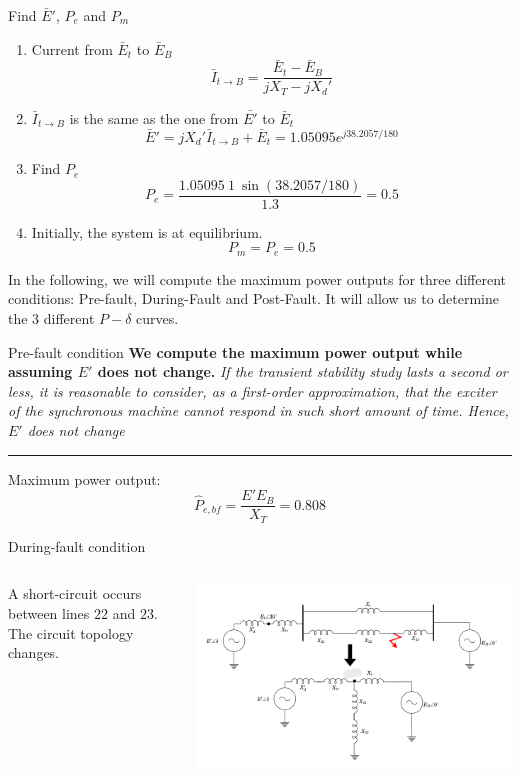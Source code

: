 \begin{frame}[allowframebreaks]{Find $\bar{E}'$, $P_e$ and $P_m$}
\begin{enumerate}
    \item Current from $\bar{E}_{t}$ to $\bar{E}_{B}$
    $$\bar{I}_{t\rightarrow B} = \frac{\bar{E}_{t}-\bar{E}_{B}}{jX_{T} - jX_{d}'}$$
    \item $\bar{I}_{t\rightarrow B}$ is the same as the one from $\bar{E'}$ to $\bar{E}_{t}$
    $$\bar{E}' = j X_{d}' \bar{I}_{t\rightarrow B} + \bar{E}_{t} = 1.05095 e^{j 38.2057/180}$$
    \item Find $P_e$
    $$P_e = \frac{1.05095\ 1\ \sin(38.2057/180)}{1.3} = 0.5$$
    \item Initially, the system is at equilibrium.
    $$P_m = P_e = 0.5$$
\end{enumerate}
In the following, we will compute the maximum power outputs for three different conditions: Pre-fault, During-Fault and Post-Fault. It will allow us to determine the 3 different $P-\delta$ curves.
\end{frame}

\begin{frame}{Pre-fault condition}
\textbf{We compute the maximum power output while assuming $E'$ does not change.}
\emph{If the transient stability study lasts a second or less, it is reasonable to consider, as a first-order approximation, that the exciter of the synchronous machine cannot respond in such short amount of time. Hence, $E'$ does not change}
\vspace{0.5cm}
\hrule
\vspace{0.5cm}
Maximum power output:
$$\hat{P}_{e,bf} = \frac{E'E_{B}}{X_{T}} = 0.808$$
\end{frame}

\begin{frame}{During-fault condition}
\begin{columns}
\begin{column}{0.25\textwidth}
A short-circuit occurs between lines $22$ and $23$. The circuit topology changes.
\end{column}
\begin{column}{0.75\textwidth}
\begin{center}
\includegraphics[width=\textwidth]{images/DuringFault.png}
\end{center}
\end{column}
\end{columns}
\end{frame}

